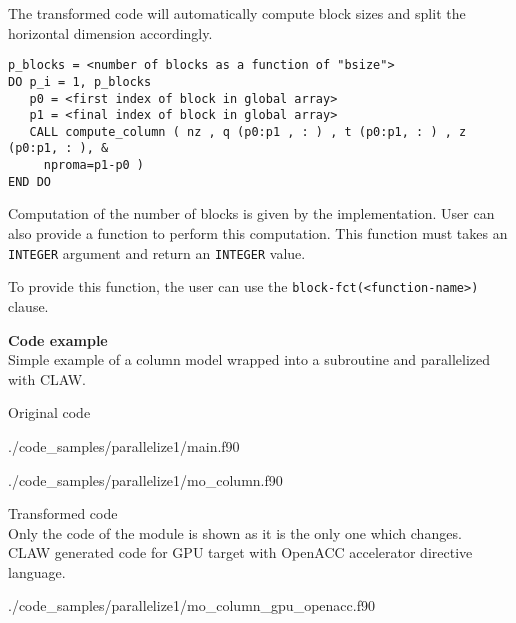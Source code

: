 The transformed code will automatically compute block sizes and split the 
horizontal dimension accordingly.
\begin{lstlisting}
p_blocks = <number of blocks as a function of "bsize">                                                                                                                                                                                                                                                 
DO p_i = 1, p_blocks                                                                                                                                                                                                                                                          
   p0 = <first index of block in global array>                                                                                                                                                                                                                                
   p1 = <final index of block in global array>                                                                                                                                                                                                                                
   CALL compute_column ( nz , q (p0:p1 , : ) , t (p0:p1, : ) , z (p0:p1, : ), &
     nproma=p1-p0 )   
END DO
\end{lstlisting}

Computation of the number of blocks is given by the implementation. User can 
also provide a function to perform this computation. This function must takes an
\lstinline|INTEGER| argument and return an \lstinline|INTEGER| value.  

To provide this function, the user can use the 
\lstinline|block-fct(<function-name>)| clause.

\textbf{Code example}\\
\label{parallelize1}
Simple example of a column model wrapped into a subroutine and parallelized with
CLAW.

Original code

  {./code_samples/parallelize1/main.f90}

  {./code_samples/parallelize1/mo_column.f90}

Transformed code\\
Only the code of the module is shown as it is the only one which changes.\\

CLAW generated code for GPU target with OpenACC accelerator directive language.

  {./code_samples/parallelize1/mo_column_gpu_openacc.f90}

